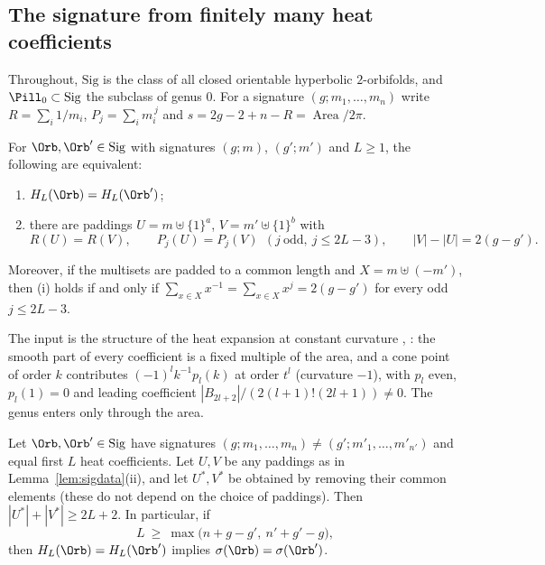 %

\newcommand{\Sig}{\mathrm{Sig}}

\subsection{The signature from finitely many heat coefficients}\label{subsec:signature}

Throughout, $\Sig$ is the class of all closed orientable hyperbolic $2$-orbifolds, and $\Pill_0\subset\Sig$
the subclass of genus $0$. For a signature $(g;m_1,\dots,m_n)$ write $R=\sum_i1/m_i$,
$P_j=\sum_im_i^{\,j}$ and $s=2g-2+n-R=\operatorname{Area}/2\pi$.

\begin{lemma}\label{lem:sigdata}
For $\Orb,\Orb'\in\Sig$ with signatures $(g;m)$, $(g';m')$ and $L\ge1$, the following are equivalent:
\begin{enumerate}[label=(\roman*)]
\item $H_L(\Orb)=H_L(\Orb')$;
\item there are paddings $U=m\uplus\{1\}^a$, $V=m'\uplus\{1\}^b$ with
\[
  R(U)=R(V),\qquad P_j(U)=P_j(V)\ \ (j\ \text{odd},\ j\le 2L-3),\qquad |V|-|U|=2(g-g').
\]
\end{enumerate}
Moreover, if the multisets are padded to a common length and $X=m\uplus(-m')$, then (i) holds if and only if
$\sum_{x\in X}x^{-1}=\sum_{x\in X}x^{j}=2(g-g')$ for every odd $j\le2L-3$.
\end{lemma}

\noindent
The input is the structure of the heat expansion at constant curvature
\cite[Theorem~4.8]{dggw2008}, \cite[Theorem~4.20]{ucar2017}: the smooth part of every coefficient is a fixed
multiple of the area, and a cone point of order $k$ contributes $(-1)^l k^{-1}p_l(k)$ at order $t^l$ (curvature $-1$), with
$p_l$ even, $p_l(1)=0$ and leading coefficient $|B_{2l+2}|/(2(l+1)!(2l+1))\neq0$. The genus enters only
through the area.

\begin{theorem}[Separation]\label{thm:sigsep}
Let $\Orb,\Orb'\in\Sig$ have signatures $(g;m_1,\dots,m_n)\neq(g';m'_1,\dots,m'_{n'})$ and equal first $L$
heat coefficients. Let $U,V$ be any paddings as in Lemma~\ref{lem:sigdata}(ii), and let $U^*,V^*$ be
obtained by removing their common elements (these do not depend on the choice of paddings). Then
$|U^*|+|V^*|\ge 2L+2$. In particular, if
\[
  L\ \ge\ \max\bigl(n+g-g',\ n'+g'-g\bigr),
\]
then $H_L(\Orb)=H_L(\Orb')$ implies $\sigma(\Orb)=\sigma(\Orb')$.
\end{theorem}

